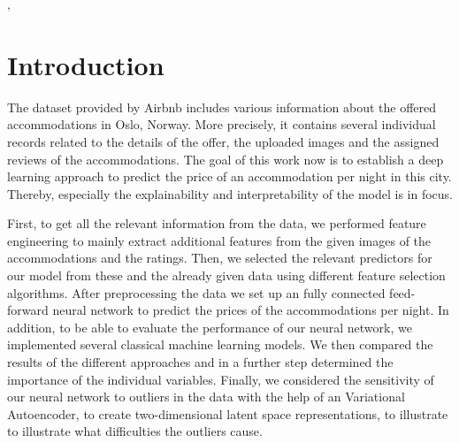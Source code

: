 ‚\section{Introduction}



The dataset provided by Airbnb includes various information about the offered accommodations in Oslo, Norway. More precisely, it contains several individual records related to the details of the offer, the uploaded images and the assigned reviews of the accommodations.
The goal of this work now is to establish a deep learning approach to predict the price of an accommodation per night in this city. Thereby, especially the explainability and interpretability of the model is in focus.

First, to get all the relevant information from the data, we performed feature engineering to mainly extract additional features from the given images of the accommodations and the ratings. Then, we selected the relevant predictors for our model from these and the already given data using different feature selection algorithms. After preprocessing the data we set up an fully connected feed-forward neural network to predict the prices of the accommodations per night. In addition, to be able to evaluate the performance of our neural network, we implemented several classical machine learning models. We then compared the results of the different approaches and in a further step determined the importance of the individual variables. Finally, we considered the sensitivity of our neural network to outliers in the data with the help of an Variational Autoencoder, to create two-dimensional latent space representations, to illustrate to illustrate what difficulties the outliers cause.

